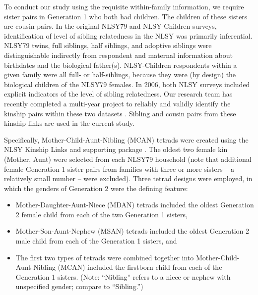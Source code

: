 To conduct our study using the requisite within-family information, we require sister pairs in Generation 1 who both had children. The children of these sisters are cousin-pairs. In the original NLSY79 and NLSY-Children surveys, identification of level of sibling relatedness in the NLSY was primarily inferential. NLSY79 twins, full siblings, half siblings, and adoptive siblings were distinguishable indirectly from respondent and maternal information about birthdates and the biological father(s). NLSY-Children respondents within a given family were all full- or half-siblings, because they were (by design) the biological children of the NLSY79 females. In 2006, both NLSY surveys included explicit indicators of the level of sibling relatedness. Our research team has recently completed a multi-year project to reliably and validly identify the kinship pairs within these two datasets \citep{nlsylinksbgpaper}. Sibling and cousin pairs from these kinship links are used in the current study.

Specifically, Mother-Child-Aunt-Nibling (MCAN) tetrads were created using the NLSY Kinship Links \citep{nlsylinksbgpaper} and supporting \R package \citep{nlsylinksr}. The oldest two female kin (Mother, Aunt) were selected from each NLSY79 household (note that additional female Generation 1 sister pairs from families with three or more sisters -- a relatively small number -- were excluded). Three tetrad designs were employed, in which the genders of Generation 2 were the defining feature: 
\begin{itemize}\item Mother-Daughter-Aunt-Niece (MDAN) tetrads included the oldest Generation 2 female child from each of the two Generation 1 sisters, 
\item Mother-Son-Aunt-Nephew (MSAN) tetrads included the oldest Generation 2 male child from each of the Generation 1 sisters, and 
\item The first two types of tetrads were combined together into Mother-Child-Aunt-Nibling (MCAN) included the firstborn child from each of the Generation 1 sisters. (Note: ``Nibling'' refers to a niece or nephew with unspecified gender; compare to ``Sibling.'')\end{itemize} 
